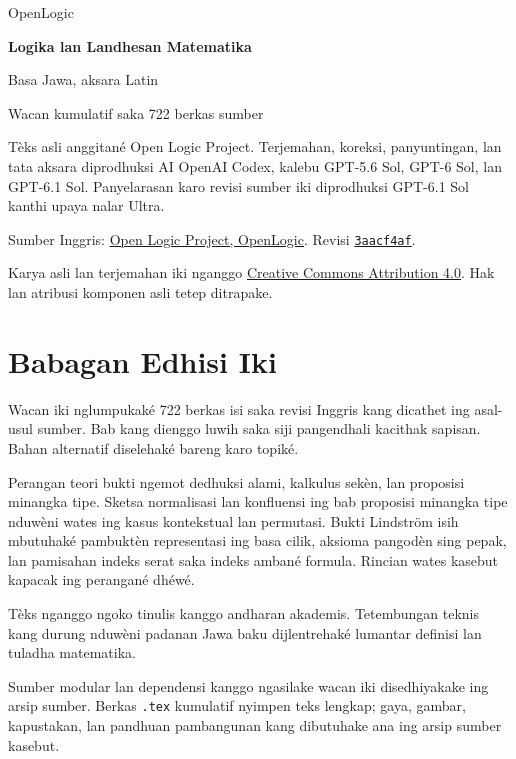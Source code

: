 \documentclass[11pt,openany,a4paper]{memoir}
\begin{document}
\frontmatter
\begin{titlingpage}
\raggedright
{\sffamily\Large OpenLogic\par}
\vspace{18mm}
{\sffamily\bfseries\Huge Logika lan Landhesan Matematika\par}
\vspace{6mm}
{\Large Basa Jawa, aksara Latin\par}
\vspace{15mm}
{\large Wacan kumulatif saka 722 berkas sumber\par}
\vfill
Tèks asli anggitané Open Logic Project. Terjemahan, koreksi,
panyuntingan, lan tata aksara diprodhuksi AI OpenAI Codex,
kalebu GPT-5.6 Sol, GPT-6 Sol, lan GPT-6.1 Sol. Panyelarasan
karo revisi sumber iki diprodhuksi GPT-6.1 Sol kanthi upaya nalar Ultra.
\par\medskip
Sumber Inggris: \href{https://github.com/OpenLogicProject/OpenLogic}{Open Logic Project, OpenLogic}.
Revisi \href{https://github.com/OpenLogicProject/OpenLogic/tree/3aacf4afad2ed3827c7cdb46b1b49942574247a6}{\texttt{3aacf4af}}.
\par\medskip
Karya asli lan terjemahan iki nganggo
\href{https://creativecommons.org/licenses/by/4.0/}{Creative Commons Attribution 4.0}.
Hak lan atribusi komponen asli tetep ditrapake.
\end{titlingpage}
\pagestyle{plain}
\chapter*{Babagan Edhisi Iki}
Wacan iki nglumpukaké 722 berkas isi saka revisi Inggris kang
dicathet ing asal-usul sumber. Bab kang dienggo luwih saka siji
pangendhali kacithak sapisan. Bahan alternatif diselehaké bareng
karo topiké.
\par\medskip
Perangan teori bukti ngemot dedhuksi alami, kalkulus sekèn, lan
proposisi minangka tipe. Sketsa normalisasi lan konfluensi ing bab
proposisi minangka tipe nduwèni wates ing kasus kontekstual lan
permutasi. Bukti Lindström isih mbutuhaké pambuktèn representasi
ing basa cilik, aksioma pangodèn sing pepak, lan pamisahan indeks
serat saka indeks ambané formula. Rincian wates kasebut
kapacak ing perangané dhéwé.
\par\medskip
Tèks nganggo ngoko tinulis kanggo andharan akademis. Tetembungan
teknis kang durung nduwèni padanan Jawa baku dijlentrehaké
lumantar definisi lan tuladha matematika.
\par\medskip
Sumber modular lan dependensi kanggo ngasilake wacan iki
disedhiyakake ing arsip sumber. Berkas \texttt{.tex} kumulatif
nyimpen teks lengkap; gaya, gambar, kapustakan, lan pandhuan
pambangunan kang dibutuhake ana ing arsip sumber kasebut.
\clearpage

\clearpage
\addtolength{\cftpartnumwidth}{1em}
\tableofcontents*
\mainmatter

\backmatter
\end{document}
